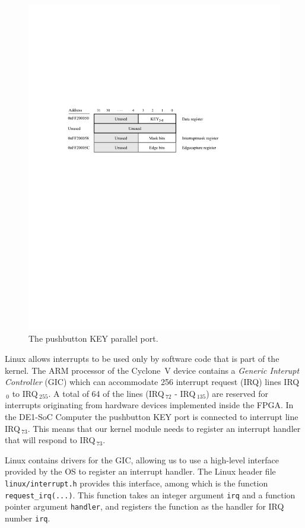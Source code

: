 \documentclass[11pt, twoside, pdftex]{article}
\begin{document}
\begin{figure}[H]
   \begin{center}
       \includegraphics{figures/fig_KEY_port.pdf}
   \end{center}
   \caption{The pushbutton KEY parallel port.}
	\label{fig:KEY}
\end{figure}

Linux allows interrupts to be used only by software code that is part of the kernel. 
The ARM processor of the Cyclone~V device contains a \textit{Generic Interupt Controller} (GIC) 
which can accommodate 256 interrupt request (IRQ) lines IRQ$\,_0$ to IRQ$\,_{255}$. A total of 
64 of the lines (IRQ$\,_{72}$ - IRQ$\,_{135}$) are 
reserved for interrupts originating from hardware devices implemented inside the FPGA. In the 
DE1-SoC Computer the pushbutton KEY port is connected to interrupt line IRQ$\,_{73}$.
This means that our kernel module needs to register an interrupt handler that will respond
to IRQ$\,_{73}$.

Linux contains drivers for the GIC, allowing us to use a high-level interface provided by 
the OS to register an interrupt handler. The Linux header file \texttt{linux/interrupt.h} 
provides this interface, among which is the function \texttt{request\_irq(...)}. This function 
takes an integer argument \texttt{irq} and a function pointer argument \texttt{handler}, and 
registers the function as the handler for IRQ number \texttt{irq}. 
\end{document}
